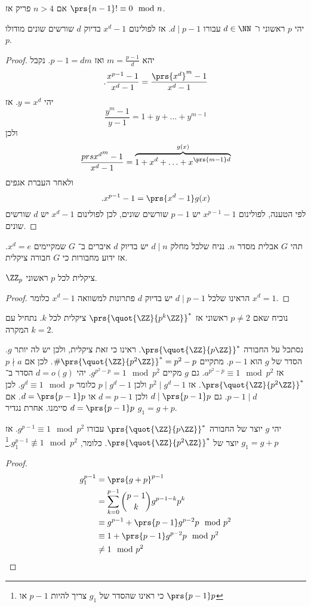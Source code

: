 \documentclass[a4paper,10pt,twoside,openany]{book}
\begin{document}
\begin{exercise}
אם
$n>4$
פריק אז
$\prs{n-1}! \equiv 0 \mod{n}$.
\end{exercise}
\begin{proposition}
יהי
$p$
ראשוני
ו־%
$d \in \NN$
עבורו
$d \mid p-1$.
אז לפולינום
$x^d - 1$
בדיוק
$d$
שורשים שונים מודולו
$p$.
\end{proposition}
\begin{proof}
יהא
$m = \frac{p-1}{d}$
ואז
$p-1 = dm$.
נקבל
\[\text{.}\frac{x^{p-1}-1}{x^d - 1} = \frac{\prs{x^d}^m - 1}{x^d - 1}\]
יהי
$y = x^d$.
אז
\[\frac{y^m - 1}{y-1} = 1+y+\ldots+y^{m-1}\]
ולכן
\begin{align*}
\frac{prs{x^d}^m - 1}{x^d - 1} = \overset{g(x)}{\overbrace{1 + x^d + \ldots + x^{\prs{m-1}d}}}
\end{align*}
ולאחר העברת אגפים
\[\text{.}x^{p-1} - 1 = \prs{x^d - 1}g(x)\]
לפי הטענה, לפולינום
$x^{p-1}-1$
יש
$p-1$
שורשים שונים, לכן לפולינום
$x^d - 1$
יש
$d$
שורשים שונים.
\end{proof}

תהי
$G$
אבלית מסדר
$n$.
נניח שלכל מחלק
$d \mid n$
יש בדיוק
$d$
איברים ב־%
$G$
שמקיימים
$x^d = e$.
אז ידוע מחבורות כי
$G$
חבורה ציקלית.

\begin{theorem}
$\ZZ_p$
ציקלית לכל
$p$
ראשוני.
\end{theorem}

\begin{proof}
הראינו שלכל
$d \mid p-1$
יש בדיוק
$d$
פתרונות למשוואה
$x^d - 1$
כלומר
$x^d = 1$.
\end{proof}

נוכיח שאם
$p \neq 2$
ראשוני אז
$\prs{\quot{\ZZ}{p^k \ZZ}}^*$
ציקלית לכל
$k$.
נתחיל עם המקרה
$k=2$.

נסתכל על החבורה
$\prs{\quot{\ZZ}{p\ZZ}}^*$.
ראינו כי זאת ציקלית, ולכן יש לה יותר
$g$.
הסדר של
$g$
הוא
$p-1$.
מתקיים
$\#\prs{\quot{\ZZ}{p^2\ZZ}}^* = p^2 - p$.
לכן אם
$p \nmid a$
אז
$a^{p^2 - p} \equiv 1 \mod{p^2}$.
גם
$g$
מקיים
$g^{p^2 - p} = 1 \mod{p^2}$.
יהי
$d = o(g)$
הסדר ב־%
$\prs{\quot{\ZZ}{p^2 \ZZ}}^*$.
אז
$p^2 \mid g^d - 1$
ולכן
$p \mid g^d - 1$
כלומר
$g^d \equiv 1 \mod{p}$.
לכן
$p-1 \mid d$.
גם
$d \mid \prs{p-1}p$
ולכן
$d = p-1$
או
$d = \prs{p-1}p$.
אם
$d = \prs{p-1}p$
סיימנו. אחרת נגדיר
$g_1 = g + p$.

\begin{proposition}
יהי
$g$
יוצר של החבורה
$\prs{\quot{\ZZ}{p\ZZ}}^*$
עבורו
$g^{p-1} \equiv 1 \mod{p^2}$.
אז
$g_1 = g + p$
יוצר של
$\prs{\quot{\ZZ}{p^2\ZZ}}^*$.
כלומר,
$g_1^{p-1} \not\equiv 1 \mod{p^2}$.\footnote{כי ראינו שהסדר של
$g_1$
צריך להיות
$p-1$
או
$\prs{p-1}p$}
\end{proposition}
\begin{proof}
\begin{align*}
g_1^{p-1} &= \prs{g + p}^{p-1} \\ &= \sum_{k=0}^{p-1} \binom{p-1}{k} g^{p-1-k}p^k \\ &\equiv
g^{p-1} + \prs{p-1}g^{p-2}p \mod{p^2} \\&\equiv 1 + \prs{p-1}g^{p-2}p \mod{p^2} \\&\neq 1 \mod{p^2}
\end{align*}
\phantom{י}
\end{proof}
\end{document}
